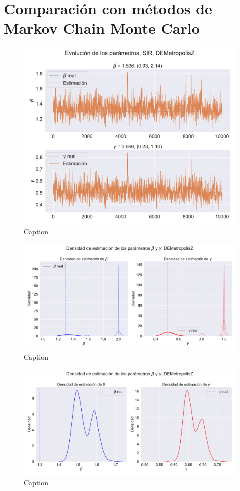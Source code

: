 \section{Comparación con métodos de Markov Chain Monte Carlo}

\begin{figure}[h]
    \centering
    \includegraphics[width=0.8\linewidth]{img/content/chapter4/DEMetropolis_sir_params_trace.pdf}
    \caption{Caption}
    \label{fig:enter-label}
\end{figure}

\begin{figure}[h]
    \centering
    \includegraphics[width=0.8\linewidth]{img/content/chapter4/DEMetropolis_sir_params_density.pdf}
    \caption{Caption}
    \label{fig:enter-label}
\end{figure}

\begin{figure}[h]
    \centering
    \includegraphics[width=0.8\linewidth]{img/content/chapter4/DMetropolis_sir_params_density_mean.pdf}
    \caption{Caption}
    \label{fig:enter-label}
\end{figure}

